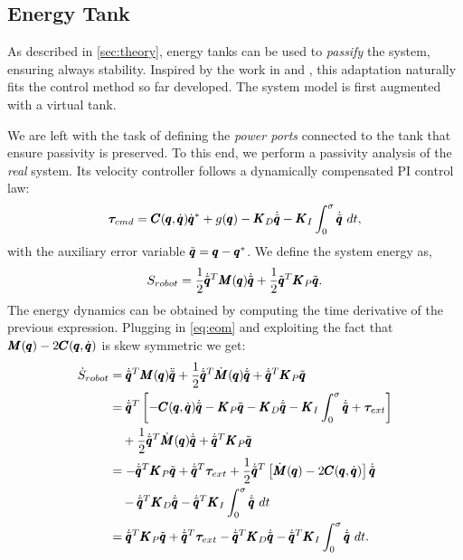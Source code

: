 \subsection{Energy Tank}
As described in \sect \ref{sec:theory}, energy tanks can be used to \emph{passify} the system, ensuring always stability. Inspired by the work in \cite{benzi2021optimization} and \cite{shahriari2018valve}, this adaptation naturally fits the control method so far developed. The system model is first augmented with a virtual tank. 

We are left with the task of defining the \emph{power ports} connected to the tank that ensure passivity is preserved. To this end, we perform a passivity analysis of the \emph{real} system. Its 
velocity controller follows a dynamically compensated PI control law:
\begin{equation}
\boldsymbol{\tau}_{cmd} = \pmb{C}(\pmb{q}, \dot{\pmb{q}}) \dot{\pmb{q}}^* + g(\pmb{q}) - \pmb{K}_D \dot{\tilde{\pmb{q}}} - \pmb{K}_I \int_{0}^{\sigma} \dot{\tilde{\pmb{q}}}\ dt,
\end{equation}
with the auxiliary error variable $\tilde{\pmb{q}} =  \pmb{q} - \pmb{q}^*$. We define the system energy as, 
\begin{equation}
    S_{robot} = \frac{1}{2} \dot{\tilde{\pmb{q}}}^T \pmb{M}(\pmb{q}) \dot{\tilde{\pmb{q}}} + \frac{1}{2} \tilde{\pmb{q}}^T \pmb{K}_P \tilde{\pmb{q}}.
\end{equation}
The energy dynamics can be obtained by computing the time derivative of the previous expression. Plugging in \eqref{eq:eom} and exploiting the fact that $\pmb{M}(\pmb{q}) - 2 \pmb{C}(\pmb{q}, \dot{\pmb{q}})$ is skew symmetric we get:
\begin{equation*}
\begin{aligned}
    \dot{S}_{robot} &= \dconfigRobotError^T \massMatrix \ddconfigRobotError + \frac{1}{2} \dconfigRobotError^T \dot{\matr{M}}(\configRobot) \dconfigRobotError + \dconfigRobotError^T \matr{K}_P \configRobotError \\
    &= \dconfigRobotError^T \left[ -\coriolis \dconfigRobotError - \matr{K}_P \configRobotError - \matr{K}_D \dconfigRobotError - \matr{K}_I \int_{0}^{\sigma} \dconfigRobotError + \externalTorque \right] \\
    &\quad + \frac{1}{2} \dconfigRobotError^T \dot{\matr{M}}(\configRobot) \dconfigRobotError + \dconfigRobotError^T \matr{K}_P \configRobotError \\
    &= -\dconfigRobotError^T \matr{K}_P \configRobotError + \dconfigRobotError^T \externalTorque + \frac{1}{2} \dconfigRobotError^T\left[ \dot{\matr{M}}(\configRobot) - 2\coriolis \right] \dconfigRobotError \\
    &\quad - \dconfigRobotError^T \matr{K}_D \dconfigRobotError  - \dconfigRobotError^T \matr{K}_I \int^{\sigma}_{0} \dconfigRobotError\ dt\\
    &= \dconfigRobotError^T \matr{K}_P \configRobotError + \dconfigRobotError^T \externalTorque - \dconfigRobotError^T \matr{K}_D \dconfigRobotError -  \dconfigRobotError^T \matr{K}_I \int^{\sigma}_{0} \dconfigRobotError\ dt.  
\end{aligned}
\end{equation*}

